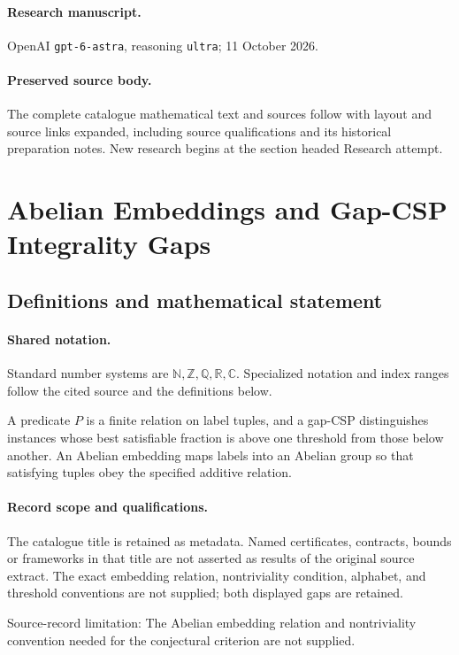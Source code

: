 \documentclass[11pt]{article}
\begin{document}
\paragraph{Research manuscript.} OpenAI \texttt{gpt-6-astra}, reasoning \texttt{ultra}; 11 October 2026.
\paragraph{Preserved source body.} The complete catalogue mathematical text and sources follow with layout and source links expanded, including source qualifications and its historical preparation notes. New research begins at the section headed Research attempt.

\section{Abelian Embeddings and Gap-CSP Integrality Gaps}\label{statement}

\subsection{Definitions and mathematical statement}

\paragraph{Shared notation.}Standard number systems are $\mathbb N,\mathbb Z,\mathbb Q,\mathbb R,\mathbb C$. Specialized notation and index ranges follow the cited source and the definitions below.


A predicate $P$ is a finite relation on label tuples, and a gap-CSP distinguishes instances whose best satisfiable fraction is above one threshold from those below another. An Abelian embedding maps labels into an Abelian group so that satisfying tuples obey the specified additive relation.
\paragraph{Record scope and qualifications.}
The catalogue title is retained as metadata. Named certificates, contracts, bounds or frameworks in that title are not asserted as results of the original source extract.
The exact embedding relation, nontriviality condition, alphabet, and threshold conventions are not supplied; both displayed gaps are retained.

Source-record limitation: The Abelian embedding relation and nontriviality convention needed for the conjectural criterion are not supplied.
\end{document}
